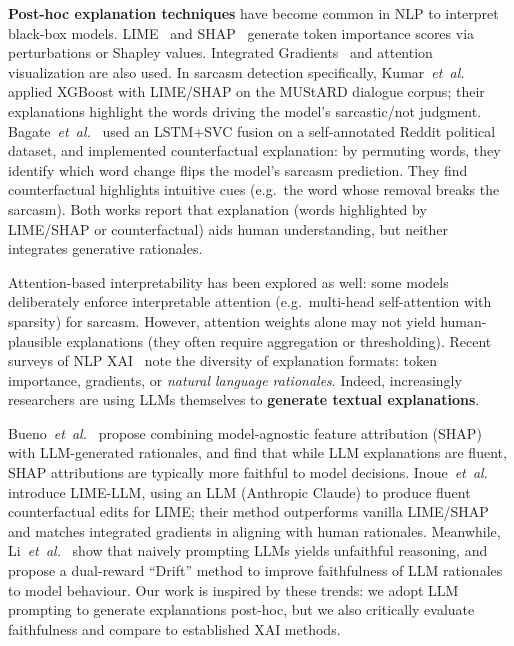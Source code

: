 \textbf{Post-hoc explanation techniques} have become common in NLP to interpret black-box models. LIME~\cite{ribeiro2016why} and SHAP~\cite{lundberg2017unified} generate token importance scores via perturbations or Shapley values. Integrated Gradients~\cite{sundararajan2017axiomatic} and attention visualization are also used. In sarcasm detection specifically, Kumar~\emph{et~al.}~\cite{kumar2021explainable} applied XGBoost with LIME/SHAP on the MUStARD dialogue corpus; their explanations highlight the words driving the model's sarcastic/not judgment. Bagate~\emph{et~al.}~\cite{bagate2025sarcasm} used an LSTM+SVC fusion on a self-annotated Reddit political dataset, and implemented counterfactual explanation: by permuting words, they identify which word change flips the model's sarcasm prediction. They find counterfactual highlights intuitive cues (e.g.\ the word whose removal breaks the sarcasm). Both works report that explanation (words highlighted by LIME/SHAP or counterfactual) aids human understanding, but neither integrates generative rationales.

Attention-based interpretability has been explored as well: some models deliberately enforce interpretable attention (e.g.\ multi-head self-attention with sparsity) for sarcasm. However, attention weights alone may not yield human-plausible explanations (they often require aggregation or thresholding). Recent surveys of NLP XAI~\cite{bilal2025llms} note the diversity of explanation formats: token importance, gradients, or \emph{natural language rationales}. Indeed, increasingly researchers are using LLMs themselves to \textbf{generate textual explanations}.

Bueno~\emph{et~al.}~\cite{bueno2026scoring} propose combining model-agnostic feature attribution (SHAP) with LLM-generated rationales, and find that while LLM explanations are fluent, SHAP attributions are typically more faithful to model decisions. Inoue~\emph{et~al.}~\cite{inoue2026lime} introduce LIME-LLM, using an LLM (Anthropic Claude) to produce fluent counterfactual edits for LIME; their method outperforms vanilla LIME/SHAP and matches integrated gradients in aligning with human rationales. Meanwhile, Li~\emph{et~al.}~\cite{li2025drift} show that naively prompting LLMs yields unfaithful reasoning, and propose a dual-reward ``Drift'' method to improve faithfulness of LLM rationales to model behaviour. Our work is inspired by these trends: we adopt LLM prompting to generate explanations post-hoc, but we also critically evaluate faithfulness and compare to established XAI methods.

